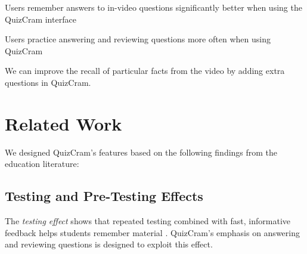 \documentclass{chi-ext}
\begin{document}
\begin{compactitem}
\item Users remember answers to in-video questions significantly better when using the QuizCram interface
\item Users practice answering and reviewing questions more often when using QuizCram
\item We can improve the recall of particular facts from the video by adding extra questions in QuizCram.
\end{compactitem}

\section{Related Work}
We designed QuizCram's features based on the following findings from the education literature:%

\subsection{Testing and Pre-Testing Effects}

The \emph{testing effect} shows that repeated testing combined with fast, informative feedback helps students remember material \cite{testingeffect}. QuizCram's emphasis on answering and reviewing questions is designed to exploit this effect.

\end{document}
